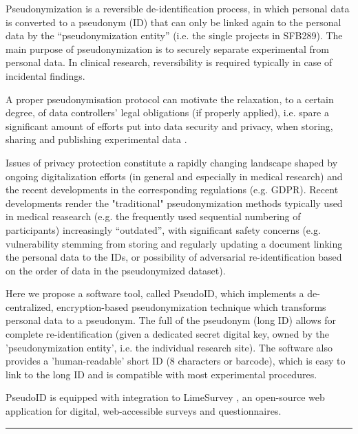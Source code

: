 Pseudonymization is a reversible de-identification process, in which personal data is converted to a pseudonym (ID) that can only be linked again to the personal data by the “pseudonymization entity” (i.e. the single projects in SFB289). The main purpose of pseudonymization is to securely separate experimental from personal data. In clinical research, reversibility is required typically in case of incidental findings.

A proper pseudonymisation protocol can motivate the relaxation, to a certain degree, of data controllers’ legal obligations (if properly applied), i.e. spare a significant amount of efforts put into data security and privacy, when storing, sharing and publishing experimental data \cite{pseudonym}.

Issues of privacy protection constitute a rapidly changing landscape shaped by ongoing digitalization efforts (in general and especially in medical research) and the recent developments in the corresponding regulations (e.g. GDPR). Recent developments render the "traditional" pseudonymization methods typically used in medical reasearch (e.g. the frequently used sequential numbering of participants) increasingly “outdated”, with significant safety concerns (e.g. vulnerability stemming from storing and regularly updating a document linking the personal data to the IDs, or possibility of adversarial re-identification based on the order of data in the pseudonymized dataset).

Here we propose a software tool, called PseudoID, which implements a de-centralized, encryption-based pseudonymization technique which transforms personal data to a pseudonym.
The full of the pseudonym (long ID) allows for complete re-identification (given a dedicated secret digital key, owned by the 'pseudonymization entity', i.e. the individual research site). The software also provides a 'human-readable' short ID (8 characters or barcode), which is easy to link to the long ID and is compatible with most experimental procedures.

PseudoID is equipped with integration to LimeSurvey \cite{limesurvey}, an open-source web application for digital, web-accessible surveys and questionnaires.

\par\noindent\rule{\textwidth\color{pniblue}}{0.4pt}

